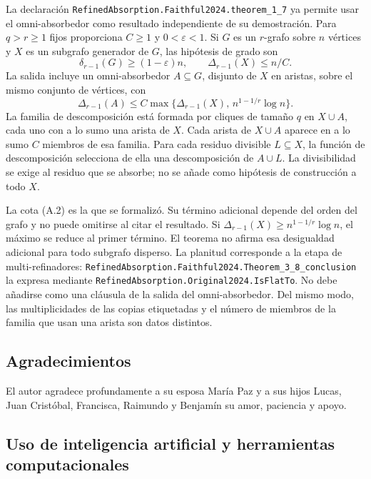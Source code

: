 \documentclass[spanish,11pt,a4paper]{article}
\begin{document}
La declaración \texttt{Refined\allowbreak{}Absorption.\allowbreak{}Faithful2024.\allowbreak{}theorem\_\allowbreak{}1\_\allowbreak{}7} ya permite usar el omni-absorbedor como resultado independiente de su demostración. Para \(q>r\ge1\) fijos proporciona \(C\ge1\) y \(0<\varepsilon<1\). Si \(G\) es un \(r\)-grafo sobre \(n\) vértices y \(X\) es un subgrafo generador de \(G\), las hipótesis de grado son \[\delta_{r-1}(G)\ge(1-\varepsilon)n,
\qquad \Delta_{r-1}(X)\le n/C.
\tag{A.1}\] La salida incluye un omni-absorbedor \(A\subseteq G\), disjunto de \(X\) en aristas, sobre el mismo conjunto de vértices, con \[\Delta_{r-1}(A)\le C\max\{\Delta_{r-1}(X),\,n^{1-1/r}\log n\}.
\tag{A.2}\] La familia de descomposición está formada por cliques de tamaño \(q\) en \(X\cup A\), cada uno con a lo sumo una arista de \(X\). Cada arista de \(X\cup A\) aparece en a lo sumo \(C\) miembros de esa familia. Para cada residuo divisible \(L\subseteq X\), la función de descomposición selecciona de ella una descomposición de \(A\cup L\). La divisibilidad se exige al residuo que se absorbe; no se añade como hipótesis de construcción a todo \(X\).

La cota (A.2) es la que se formalizó. Su término adicional depende del orden del grafo y no puede omitirse al citar el resultado. Si \(\Delta_{r-1}(X)\ge n^{1-1/r}\log n\), el máximo se reduce al primer término. El teorema no afirma esa desigualdad adicional para todo subgrafo disperso. La planitud corresponde a la etapa de multi-refinadores: \texttt{Refined\allowbreak{}Absorption.\allowbreak{}Faithful2024.\allowbreak{}Theorem\_\allowbreak{}3\_\allowbreak{}8\_\allowbreak{}conclusion} la expresa mediante \texttt{Refined\allowbreak{}Absorption.\allowbreak{}Original2024.\allowbreak{}Is\allowbreak{}Flat\allowbreak{}To}. No debe añadirse como una cláusula de la salida del omni-absorbedor. Del mismo modo, las multiplicidades de las copias etiquetadas y el número de miembros de la familia que usan una arista son datos distintos.

\subsection{Agradecimientos}\label{agradecimientos}

El autor agradece profundamente a su esposa María Paz y a sus hijos Lucas, Juan Cristóbal, Francisca, Raimundo y Benjamín su amor, paciencia y apoyo.

\subsection{Uso de inteligencia artificial y herramientas computacionales}\label{uso-de-inteligencia-artificial-y-herramientas-computacionales}
\end{document}
